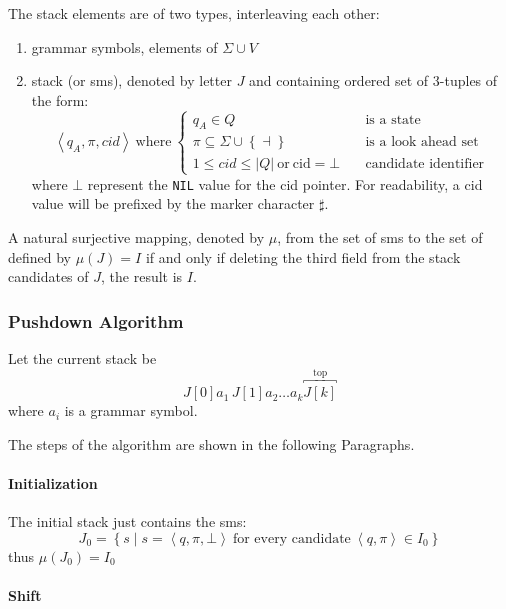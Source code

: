 \documentclass[english]{article}
\begin{document}
The stack elements are of two types, interleaving each other:

\begin{enumerate}
  \item grammar symbols, elements of \(\Sigma \cup V\)
  \item stack \mstates (or sms), denoted by letter \(J\) and containing ordered set of \(3\)-tuples of the form:
        \[ \left\langle q_A, \pi, \textit{cid} \right\rangle \ \text{where} \ \begin{cases}
            q_A \in Q \quad                                                      & \text{is a state}           \\
            \pi \subseteq \Sigma \cup \left\{ \dashv \right\} \quad              & \text{is a look ahead set}  \\
            1 \leq \textit{cid} \leq | Q | \ \text{or} \ \text{cid} = \bot \quad & \text{candidate identifier}
          \end{cases} \]
        where \(\bot\) represent the \texttt{NIL} value for the cid pointer.
        For readability, a cid value will be prefixed by the marker character \(\sharp\).
\end{enumerate}

A natural surjective mapping, denoted by \(\mu\), from the set of sms to the set of \mstates defined by \(\mu(J) = I\) if and only if deleting the third field from the stack candidates of \(J\), the result is \(I\).

\subsubsection{Pushdown Algorithm}

Let the current stack be
\[ J[0] a_1 \, J[1] a_2 \ldots a_k \overbracket{J[k]}^{\text{top}} \]
where \(a_i\) is a grammar symbol.

The steps of the algorithm are shown in the following Paragraphs.

\paragraph*{Initialization}

The initial stack just contains the sms:
\[ J_0 = \left\{ s \mid s = \left\langle q, \pi, \bot \right\rangle \ \text{for every candidate} \ \left\langle q, \pi \right\rangle \in I_0 \right\} \]
thus \(\mu(J_0) = I_0\)

\paragraph*{Shift}
\end{document}
